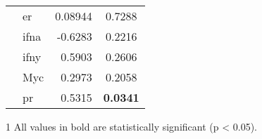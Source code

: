 \begin{table}[htpb]
\begin{threeparttable}
\begin{tabular}{llrc}
                                                                           & \gls{er}   & 0.08944   & 0.7288 \\
                                                                           & \gls{ifna} & -0.6283   & 0.2216 \\
                                                                           & \gls{ifny} & 0.5903    & 0.2606 \\
                                                                           & Myc        & 0.2973    & 0.2058 \\
                                                                           & \gls{pr}   & 0.5315    & \bfseries 0.0341  \\
				\hline
				\hline
			\end{tabular}
			\begin{tablenotes}
				\begin{footnotesize}
				\item [1] All values in bold are statistically significant (p \textless{} 0.05).
				\end{footnotesize}
			\end{tablenotes}
		\end{threeparttable}
	\end{table}

